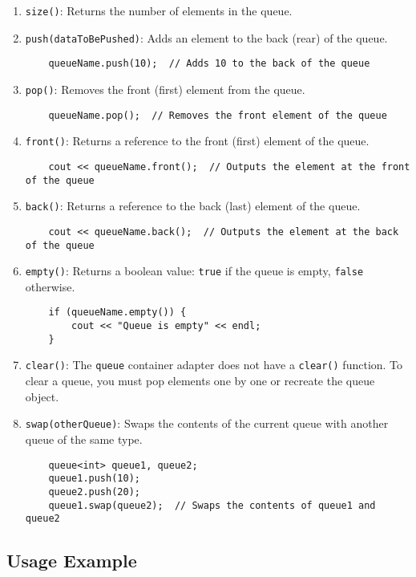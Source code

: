 \documentclass{article}
\begin{document}
\begin{enumerate}
    \item \texttt{size()}: Returns the number of elements in the queue.
    \item \texttt{push(dataToBePushed)}: Adds an element to the back (rear) of the queue.
    \begin{lstlisting}
    queueName.push(10);  // Adds 10 to the back of the queue
    \end{lstlisting}
    \item \texttt{pop()}: Removes the front (first) element from the queue.
    \begin{lstlisting}
    queueName.pop();  // Removes the front element of the queue
    \end{lstlisting}
    \item \texttt{front()}: Returns a reference to the front (first) element of the queue.
    \begin{lstlisting}
    cout << queueName.front();  // Outputs the element at the front of the queue
    \end{lstlisting}
    \item \texttt{back()}: Returns a reference to the back (last) element of the queue.
    \begin{lstlisting}
    cout << queueName.back();  // Outputs the element at the back of the queue
    \end{lstlisting}
    \item \texttt{empty()}: Returns a boolean value: \texttt{true} if the queue is empty, \texttt{false} otherwise.
    \begin{lstlisting}
    if (queueName.empty()) {
        cout << "Queue is empty" << endl;
    }
    \end{lstlisting}
    \item \texttt{clear()}: The \texttt{queue} container adapter does not have a \texttt{clear()} function. To clear a queue, you must pop elements one by one or recreate the queue object.
    \item \texttt{swap(otherQueue)}: Swaps the contents of the current queue with another queue of the same type.
    \begin{lstlisting}
    queue<int> queue1, queue2;
    queue1.push(10);
    queue2.push(20);
    queue1.swap(queue2);  // Swaps the contents of queue1 and queue2
    \end{lstlisting}
\end{enumerate}

\subsection{Usage Example}
\end{document}
